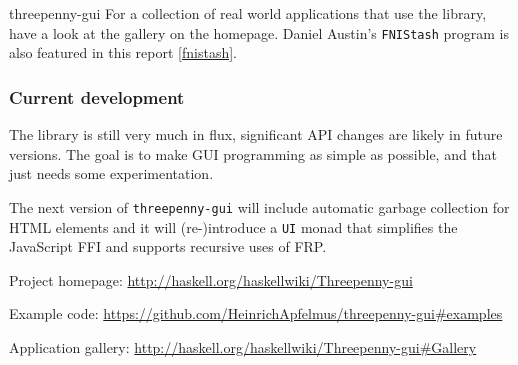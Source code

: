 \begin{hcarentry}[new]{threepenny-gui}
For a collection of real world applications that use the library, have a look at the gallery on the homepage. Daniel Austin's \verb`FNIStash` program is also featured in this report \cref{fnistash}.

\subsubsection*{Current development}

The library is still very much in flux, significant API changes are likely in future versions. The goal is to make GUI programming as simple as possible, and that just needs some experimentation.

The next version of \verb`threepenny-gui` will include automatic garbage collection for HTML elements and it will (re-)introduce a \verb`UI` monad that simplifies the JavaScript FFI and supports recursive uses of FRP.

\FurtherReading
\begin{compactitem}
\item Project homepage: \url{http://haskell.org/haskellwiki/Threepenny-gui}
\item Example code: \url{https://github.com/HeinrichApfelmus/threepenny-gui#examples}
\item Application gallery: \url{http://haskell.org/haskellwiki/Threepenny-gui#Gallery}
\end{compactitem}
\end{hcarentry}

